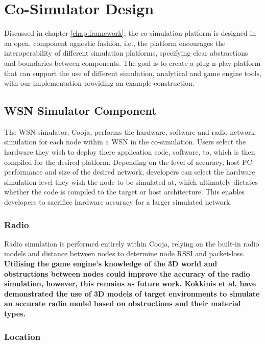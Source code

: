 \section{Co-Simulator Design}
\label{sec:Design}
Discussed in chapter \ref{chap:framework}, the co-simulation platform is designed in an open, component agnostic fashion, i.e., the platform encourages the interoperability of different simulation platforms, specifying clear abstractions and boundaries between components. The goal is to create a plug-n-play platform that can support the use of different simulation, analytical and game engine tools, with our implementation providing an example construction.

\subsection{WSN Simulator Component} %
\label{sub:wsn_simulator_component}

The WSN simulator, Cooja, performs the hardware, software and radio network simulation for each node within a WSN in the co-simulation. 
Users select the hardware they wish to deploy there application code, software, to, which is then compiled for the desired platform. Depending on the level of accuracy, host PC performance and size of the desired network, developers can select the hardware simulation level they wish the node to be simulated at, which ultimately dictates whether the code is compiled to the target or host architecture. This enables developers to sacrifice hardware accuracy for a larger simulated network.

\subsubsection{Radio} %
\label{ssub:radio}

Radio simulation is performed entirely within Cooja, relying on the built-in radio models and distance between nodes to determine node RSSI and packet-loss. \textbf{Utilising the game engine's knowledge of the 3D world and obstructions between nodes could improve the accuracy of the radio simulation, however, this remains as future work. Kokkinis et al.\cite{trunetWireless} have demonstrated the use of 3D models of target environments to simulate an accurate radio model based on obstructions and their material types.}


\subsubsection{Location} %
\label{ssub:location}

